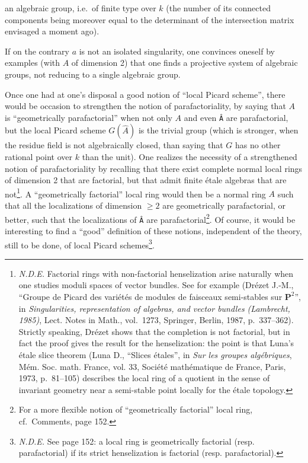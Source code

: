\documentclass[
]{article}
\begin{document}
an algebraic group, i.e.~of finite type over \(k\) (the number of its
connected components being moreover equal to the determinant of the
intersection matrix envisaged a moment ago).

If on the contrary \(a\) is not an isolated singularity, one convinces
oneself by examples (with \(A\) of dimension 2) that one finds a
projective system of algebraic groups, not reducing to a single
algebraic group.

Once one had at one's disposal a good notion of ``local Picard scheme'',
there would be occasion to strengthen the notion of parafactoriality, by
saying that \(A\) is ``geometrically parafactorial'' when not only \(A\)
and even \texttt{Â} are parafactorial, but the local Picard scheme
\(G(\hat{A})\) is the trivial group (which is stronger, when the residue
field is not algebraically closed, than saying that \(G\) has no other
rational point over \(k\) than the unit). One realizes the necessity of
a strengthened notion of parafactoriality by recalling that there exist
complete normal local rings of dimension 2 that are factorial, but that
admit finite étale algebras that are not\footnote{\emph{N.D.E.}
  Factorial rings with non-factorial henselization arise naturally when
  one studies moduli spaces of vector bundles. See for example (Drézet
  J.-M., ``Groupe de Picard des variétés de modules de faisceaux
  semi-stables sur \(\mathbf{P}^{2}\)'', in \emph{Singularities,
  representation of algebras, and vector bundles (Lambrecht, 1985)},
  Lect. Notes in Math., vol.~1273, Springer, Berlin, 1987, p.~337--362).
  Strictly speaking, Drézet shows that the completion is not factorial,
  but in fact the proof gives the result for the henselization: the
  point is that Luna's étale slice theorem (Luna D., ``Slices étales'',
  in \emph{Sur les groupes algébriques}, Mém. Soc. math. France, vol.
  33, Société mathématique de France, Paris, 1973, p.~81--105) describes
  the local ring of a quotient in the sense of invariant geometry near a
  semi-stable point locally for the étale topology.}. A ``geometrically
factorial'' local ring would then be a normal ring \(A\) such that all
the localizations of dimension \(\geqslant 2\) are geometrically
parafactorial, or better, such that the localizations of \texttt{Â} are
parafactorial\footnote{For a more flexible notion of ``geometrically
  factorial'' local ring, cf.~Comments, page 152.}. Of course, it would
be interesting to find a ``good'' definition of these notions,
independent of the theory, still to be done, of local Picard
schemes\footnote{\emph{N.D.E.} See page 152: a local ring is
  geometrically factorial (resp. parafactorial) if its strict
  henselization is factorial (resp. parafactorial).}.
\end{document}
